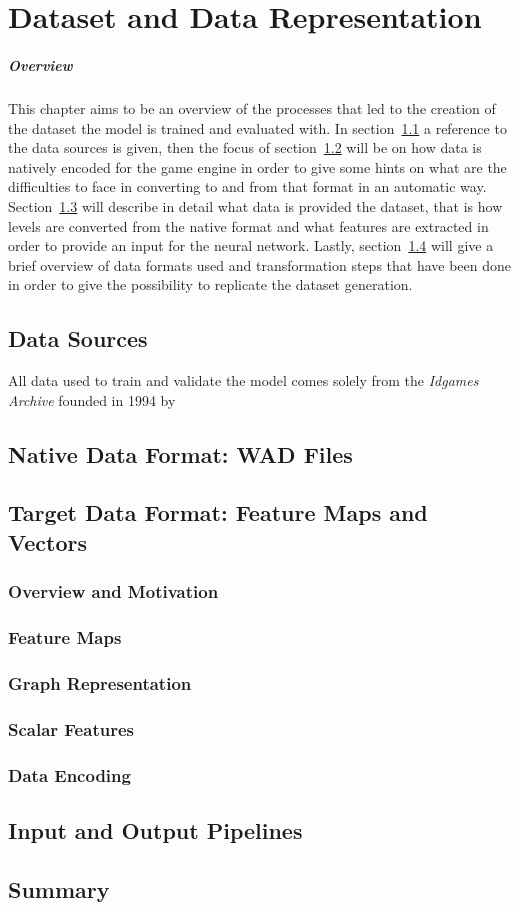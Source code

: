 \chapter{Dataset and Data Representation}
\paragraph{Overview}
This chapter aims to be an overview of the processes that led to the creation of the dataset the model is trained and evaluated with.
In section~\ref{sec:Sources} a reference to the data sources is given, then the focus of section~\ref{sec:WAD} will be on how data is natively encoded for the game engine in order to give some hints on what are the difficulties to face in converting to and from that format in an automatic way. Section~\ref{sec:TargetFormat} will describe in detail what data is provided  the dataset, that is how levels are converted from the native format and what features are extracted in order to provide an input for the neural network. Lastly, section~\ref{sec:I/O} will give a brief overview of data formats used and transformation steps that have been done in order to give the possibility to replicate the dataset generation.
 
\section{Data Sources}
\label{sec:Sources}
All data used to train and validate the model comes solely from the \textit{Idgames Archive} founded in 1994 by \cite{idarchive}
\section{Native Data Format: WAD Files}
\label{sec:WAD}
\section{Target Data Format: Feature Maps and Vectors}
\label{sec:TargetFormat}
\subsection{Overview and Motivation}
\subsection{Feature Maps}
\subsection{Graph Representation}
\subsection{Scalar Features}
\subsection{Data Encoding}
\section{Input and Output Pipelines}
\label{sec:I/O}
\section{Summary}